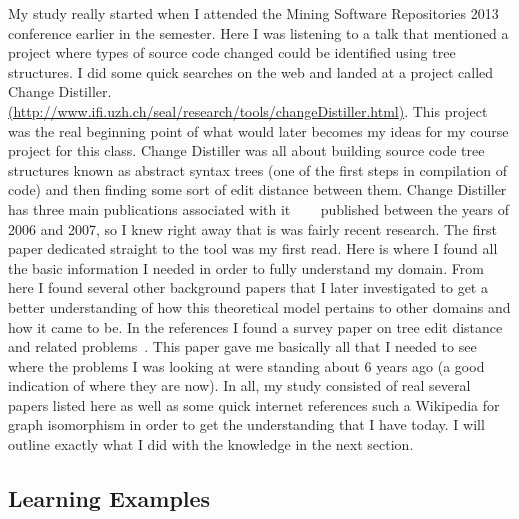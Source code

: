 \documentclass[conference]{IEEEtran}
\begin{document}
My study really started when I attended the Mining Software Repositories 2013 conference earlier in the semester. Here I was listening
to a talk that mentioned a project where types of source code changed could be identified using tree structures. I did some quick searches
on the web and landed at a project called Change Distiller.
\href{http://www.ifi.uzh.ch/seal/research/tools/changeDistiller.html}{(http://www.ifi.uzh.ch/seal/research/tools/changeDistiller.html)}. This
project was the real beginning point of what would later becomes my ideas for my course project for this class. Change Distiller was all about
building source code tree structures known as abstract syntax trees (one of the first steps in compilation of code) and then finding some 
sort of edit distance between them. Change Distiller has three main publications associated with it~\cite{Fluri:2007:CDT}~\cite{Fluri:2007:CCC}
~\cite{Fluri:2006:CCT} published between the years of 2006 and
2007, so I knew right away that is was fairly recent research. The first paper dedicated straight to the tool was my first read. Here is where
I found all the basic information I needed in order to fully understand my domain. From here I found several other background papers that
I later investigated to get a better understanding of how this theoretical model pertains to other domains and how it came to be. In the references
I found a survey paper on tree edit distance and related problems~\cite{Bille2005217}. This paper gave me basically all that I needed to 
see where the problems I was looking at were standing about 6 years ago (a good indication of where they are now). In all, my study consisted
of real several papers listed here as well as some quick internet references such a Wikipedia for graph isomorphism in order to get the
understanding that I have today. I will outline exactly what I did with the knowledge in the next section.

\subsection{Learning Examples}
\end{document}
